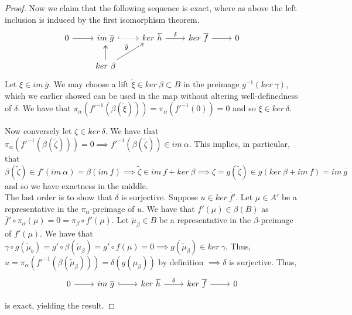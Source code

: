 \documentclass{article}
\begin{document}
\begin{proof}
  Now we claim that the following sequence is exact, where as above the left inclusion is induced by the first isomorphism theorem.
  \[
  \begin{tikzcd}
0 \arrow[r] & im \ \overline g \arrow[r, dotted, hook]                   & ker \ \overline h \arrow[r, "\delta"] & ker \ \overline f \arrow[r] & 0 \\
            & ker \ \beta \arrow[ru, "\overline g"] \arrow[u, two heads] &                                       &                             &     
          \end{tikzcd}
        \]
Let $\xi \in im \ \overline g$. We may choose a lift $\widetilde \xi \in ker \ \beta \subset B$ in the preimage $g^{-1}(ker \ \gamma)$, which we earlier showed can be used in the map without altering well-definedness of $\delta$. We have that $\pi_{\alpha}(f'^{-1}(\beta (\widetilde \xi))) = \pi_{\alpha}(f'^{-1}(0)) = 0$ and so $\xi \in ker \ \delta$.    

\newpage

Now conversely let $\zeta \in ker \ \delta$. We have that $\pi_{\alpha}(f'^{-1}(\beta (\widetilde \zeta))) = 0 \implies f'^{-1}(\beta(\widetilde \zeta)) \in im \ \alpha$. This implies, in particular, that $\beta(\widetilde \zeta) \in f'(im \ \alpha) = \beta(im \ f) \implies \widetilde \zeta \in im \ f + ker \ \beta \implies \zeta = g(\widetilde \zeta) \in g(ker \ \beta + im \ f) = im \ \overline g$ and so we have exactness in the middle. \\

The last order is to show that $\delta$ is surjective. Suppose $u \in ker \ \overline f'$. Let $\mu \in A'$ be a representative in the $\pi_{\alpha}$-preimage of $u$. We have that $f'(\mu) \in \beta(B)$ as $\overline f'\circ \pi_{\alpha}(\mu) = 0 = \pi_{\beta} \circ f'(\mu)$. Let $\widetilde \mu_{\beta} \in B$ be a representative in the $\beta$-preimage of $f'(\mu)$. We have that $\gamma \circ g(\widetilde \mu_{b}) = g'\circ \beta(\widetilde \mu_{\beta}) = g' \circ f(\mu) = 0 \implies g(\widetilde \mu_{\beta}) \in ker \ \gamma$. Thus, $u = \pi_{\alpha}(f'^{-1}(\beta (\widetilde \mu_{\beta}))) = \delta(g(\mu_{\beta}))$ by definition $\implies \delta$ is surjective. Thus,
\[
  \begin{tikzcd}
0 \arrow[r] & im \ \overline g \arrow[r, hook] & ker \ \overline h \arrow[r, "\delta"] & ker \ \overline f \arrow[r] & 0
\end{tikzcd}
\]

is exact, yielding the result. 
\end{proof}
\end{document}
